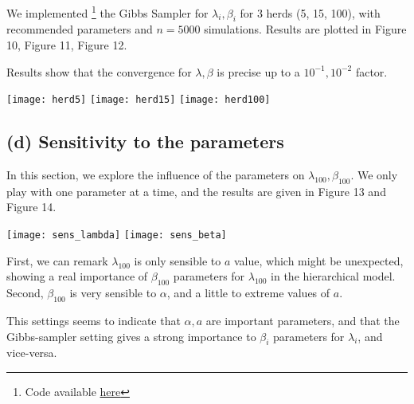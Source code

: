 \documentclass{article}
\begin{document}
We implemented \footnote{Code available \href{https://github.com/sally14/ComputationalStats/blob/master/TD3/gibbs_mastitis.ipynb}{here}} 
the Gibbs Sampler for $\lambda_i, \beta_i$ for $3$ herds (5, 15, 100), with recommended parameters
and $n=5000$ simulations. 
Results are plotted in Figure 10, Figure 11, Figure 12. 

Results show that the convergence for $\lambda, \beta$
is precise up to a $10^{-1} , 10^{-2}$ factor. 

\begin{center}
    \texttt{[image: herd5]}
    \vspace{2cm}
    \texttt{[image: herd15]}
    \texttt{[image: herd100]}
\end{center}

\newpage
\subsection*{(d) Sensitivity to the parameters}
In this section, we explore the influence of the parameters 
on $\lambda_{100}, \beta_{100}$. We only play with one parameter at a time, 
and the results are given in Figure 13 and Figure 14.
\begin{center}
    \begin{multicols}{2}
        \texttt{[image: sens\_lambda]}
        \vspace{0.5cm}
        \texttt{[image: sens\_beta]}
    \end{multicols}
\end{center}

First, we can remark $\lambda_{100}$ is only sensible to $a$ value,
 which might be unexpected, showing a real importance of $\beta_{100}$ 
 parameters
 for $\lambda_{100}$ in the hierarchical model. Second, $\beta_{100}$ 
 is very sensible to $\alpha$, and a little to extreme values of $a$.

This settings seems to indicate that $\alpha, a$ are important parameters, 
and that the Gibbs-sampler setting gives a strong importance to $\beta_i$ parameters
for $\lambda_i$, and vice-versa.

\end{document}
